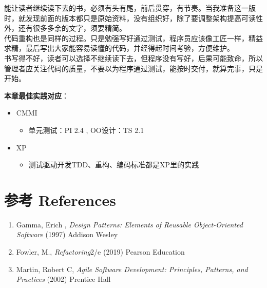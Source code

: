能让读者继续读下去的书，必须有头有尾，前后贯穿，有节奏。当我准备这一版时，就发现前面的版本都只是原始资料，没有组织好，除了要调整架构提高可读性外，还有很多多余的文字，须要精简。\\
代码重构也是同样的过程。只是勉强写好通过测试，程序员应该像工匠一样，精益求精，最后写出大家能容易读懂的代码，并经得起时间考验，方便维护。\\
书写得不好，读者可以选择不继续读下去，但程序没有写好，后果可能致命，所以管理者应关注代码的质量，不要以为程序通过测试，能按时交付，就算完事，只是开始。

\textbf{本章最佳实践对应}：

\begin{itemize}
\tightlist
\item
  CMMI

  \begin{itemize}
  \tightlist
  \item
    单元测试：PI 2.4 , OO设计：TS 2.1
  \end{itemize}
\item
  XP

  \begin{itemize}
  \tightlist
  \item
    测试驱动开发TDD、重构、编码标准都是XP里的实践
  \end{itemize}
\end{itemize}

\hypertarget{ux53c2ux8003-references}{%
\section{参考 References}\label{ux53c2ux8003-references}}

\begin{enumerate}
\tightlist
\item
  Gamma, Erich , \emph{Design Patterns: Elements of Reusable
  Object-Oriented Software} (1997) Addison Wesley\\
\item
  Fowler, M., \emph{Refactoring}2/e (2019) Pearson Education\\
\item
  Martin, Robert C, \emph{Agile Software Development: Principles,
  Patterns, and Practices} (2002) Prentice Hall\\
\end{enumerate}




